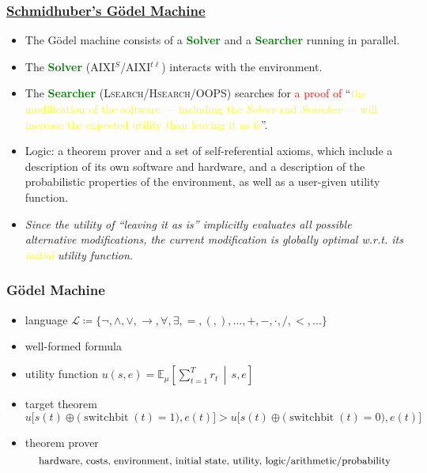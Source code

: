 \documentclass[UTF8,aspectratio=43,11pt,colorlinks,compress,openany]{beamer}%
\begin{document}
\begin{frame}\frametitle{\href{http://people.idsia.ch/~juergen/ultimatecognition.pdf}{Schmidhuber's G\"odel Machine}}
	\begin{block}{}
		\begin{itemize}
			\item The G\"odel machine consists of a \textcolor{green}{\textbf{Solver}} and a \textcolor{green}{\textbf{Searcher}} running in parallel.
			\item The \textcolor{green}{\textbf{Solver}} (AIXI$^S$/AIXI$^{t\ell}$) interacts with the environment.
			\item The \textcolor{green}{\textbf{Searcher}} (\textsc{Lsearch}/\textsc{Hsearch}/OOPS) searches for \textcolor{red}{a proof of} ``\textcolor{yellow}{the modification of the software --- including the \textit{Solver} and \textit{Searcher} --- will increase the expected utility than leaving it as is}''.
			\item Logic: a theorem prover and a set of self-referential axioms, which include a description of its own software and hardware, and a description of the probabilistic properties of the environment, as well as a user-given utility function.
			\item \emph{Since the utility of ``leaving it as is'' implicitly evaluates all possible alternative modifications, the current modification is globally optimal w.r.t. its \textcolor{yellow}{initial} utility function.}
		\end{itemize}
	\end{block}
\end{frame}

\begin{frame}\frametitle{G\"odel Machine}
\begin{itemize}
	\item language $\mathscr{L}\coloneqq \{\neg,\wedge,\vee,\to,\forall,\exists,=,(,),\ldots,+,-,\cdot,/,<,\ldots\}$
	\item well-formed formula
	\item utility function $u(s,e)=\mathbb{E}_\mu \left[\sum\limits_{t=1}^T r_t\,\middle|\,s,e\right]$
	\item target theorem
\[u\big[s(t)\oplus\big(\operatorname{switchbit}(t)=1\big), e(t)\big] > u\big[s(t)\oplus\big(\operatorname{switchbit}(t)=0\big), e(t)\big]\]
	\item theorem prover
	\[\text{\small hardware, costs, environment, initial state, utility, logic/arithmetic/probability}\]
\end{itemize}
\end{frame}
\end{document}
